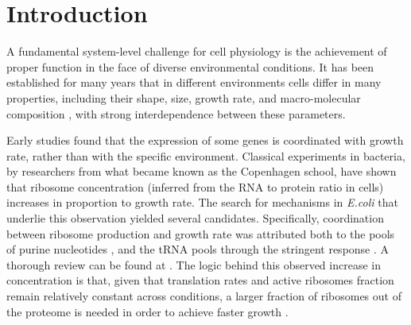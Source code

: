 \documentclass[notitlepage]{article}
\begin{document}
\section{Introduction}
A fundamental system-level challenge for cell physiology is the achievement of proper function in the face of diverse environmental conditions.
It has been established for many years that in different environments cells differ in many properties, including their shape, size, growth rate, and macro-molecular composition \cite{Schaechter1958, Maaloe1969, Churchward1982, Pedersen1978a, ingraham1983growth,Bremer1987}, with strong interdependence between these parameters.

Early studies found that the expression of some genes is coordinated with growth rate, rather than with the specific environment.
Classical experiments in bacteria, by researchers from what became known as the Copenhagen school, have shown that ribosome concentration (inferred from the RNA to protein ratio in cells) increases in proportion to growth rate\cite{Schaechter1958}.
The search for mechanisms in \emph{E.coli} that underlie this observation yielded several candidates.
Specifically, coordination between ribosome production and growth rate was attributed both to the pools of purine nucleotides \cite{Gourse1996,Gaal1997}, and the tRNA pools through the stringent response \cite{Chatterji2001,Brauer2008a}.
A thorough review can be found at \cite{Nomura1984}.
The logic behind this observed increase in concentration is that, given that translation rates and active ribosomes fraction remain relatively constant across conditions, a larger fraction of ribosomes out of the proteome is needed in order to achieve faster growth \cite{neidhardt1999a,dennis2004,Zaslaver2009}.
\end{document}
